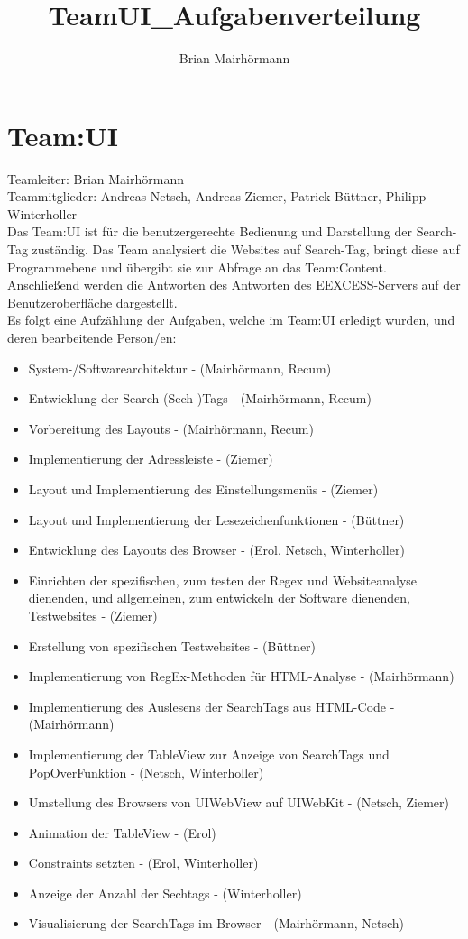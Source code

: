 \documentclass[a4paper,12pt]{article}
\title{TeamUI_Aufgabenverteilung}
\author{Brian Mairhörmann}
\begin{document}
\section{Team:UI}

Teamleiter: Brian Mairhörmann\\
Teammitglieder: Andreas Netsch, Andreas Ziemer, Patrick Büttner, Philipp Winterholler\\
Das Team:UI ist für die benutzergerechte Bedienung und Darstellung der Search-Tag zuständig.
Das Team analysiert die Websites auf Search-Tag, bringt diese auf Programmebene und übergibt sie
zur Abfrage an das Team:Content. Anschließend werden die Antworten des Antworten des EEXCESS-Servers
auf der Benutzeroberfläche dargestellt.\\
Es folgt eine Aufzählung der Aufgaben, welche im Team:UI erledigt wurden, und deren bearbeitende Person/en:\\
\begin{itemize}
	\item System-/Softwarearchitektur - (Mairhörmann, Recum)
	\item Entwicklung der Search-(Sech-)Tags - (Mairhörmann, Recum)
	\item Vorbereitung des Layouts - (Mairhörmann, Recum)
	\item Implementierung der Adressleiste - (Ziemer)
	\item Layout und Implementierung des Einstellungsmenüs - (Ziemer)
	\item Layout und Implementierung der Lesezeichenfunktionen - (Büttner)
	\item Entwicklung des Layouts des Browser - (Erol, Netsch, Winterholler)
	\item Einrichten der spezifischen, zum testen der Regex und Websiteanalyse dienenden, und allgemeinen, zum entwickeln der Software dienenden, Testwebsites - (Ziemer)
	\item Erstellung von spezifischen Testwebsites - (Büttner)
	\item Implementierung von RegEx-Methoden für HTML-Analyse - (Mairhörmann)
	\item Implementierung des Auslesens der SearchTags aus HTML-Code - (Mairhörmann)
	\item Implementierung der TableView zur Anzeige von SearchTags und PopOverFunktion - (Netsch, Winterholler)
	\item Umstellung des Browsers von UIWebView auf UIWebKit - (Netsch, Ziemer)
	\item Animation der TableView - (Erol)
	\item Constraints setzten - (Erol, Winterholler)
	\item Anzeige der Anzahl der Sechtags - (Winterholler)
	\item Visualisierung der SearchTags im Browser - (Mairhörmann, Netsch)
\end{itemize}
\end{document}
